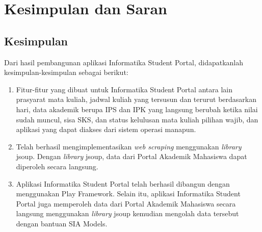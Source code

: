 \chapter{Kesimpulan dan Saran}
\label{chap:kesimpulan_saran}

\section{Kesimpulan}
\label{sec:kesimpulan}
Dari hasil pembangunan aplikasi Informatika Student Portal, didapatkanlah kesimpulan-kesimpulan sebagai berikut:
		\begin{enumerate}
			\item Fitur-fitur yang dibuat untuk Informatika Student Portal antara lain prasyarat mata kuliah, jadwal kuliah yang tersusun dan terurut berdasarkan hari, data akademik berupa IPS dan IPK yang langsung berubah ketika nilai sudah muncul, sisa SKS, dan status kelulusan mata kuliah pilihan wajib, dan aplikasi yang dapat diakses dari sistem operasi manapun.
			\item Telah berhasil mengimplementasikan \textit{web scraping} menggunakan \textit{library} jsoup. Dengan \textit{library} jsoup, data dari Portal Akademik Mahasiswa dapat diperoleh secara langsung.
			\item Aplikasi Informatika Student Portal telah berhasil dibangun dengan menggunakan Play Framework. Selain itu, aplikasi Informatika Student Portal juga memperoleh data dari Portal Akademik Mahasiswa secara langsung menggunakan \textit{library} jsoup kemudian mengolah data tersebut dengan bantuan SIA Models. 
		\end{enumerate}

